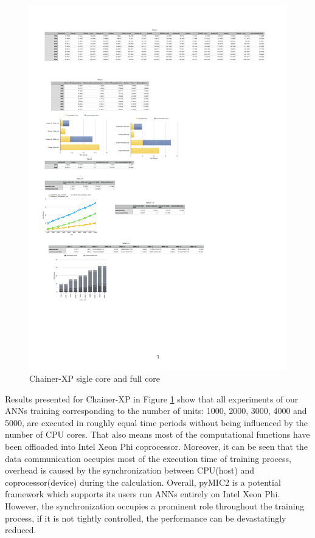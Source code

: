 \begin{figure}[]
\centering
\includegraphics[scale=0.6]{img/a.pdf}
\caption{Chainer-XP sigle core and full core}
\label{fig:1-core-and-full-core}
\end{figure}

Results presented for Chainer-XP in Figure \ref{fig:1-core-and-full-core} show that all experiments of our ANNs training corresponding to the number of units: 1000, 2000, 3000, 4000 and 5000, are executed in roughly equal time periods without being influenced by the number of CPU cores. That also means most of the computational functions have been offloaded into Intel Xeon Phi coprocessor. Moreover, it can be seen that the data communication occupies most of the execution time of training process, overhead is caused by the synchronization between CPU(host) and coprocessor(device) during the calculation. Overall, pyMIC2 is a potential framework which supports its users run ANNs entirely on Intel Xeon Phi. However, the synchronization occupies a prominent role throughout the training process, if it is not tightly controlled, the performance can be devastatingly reduced.


